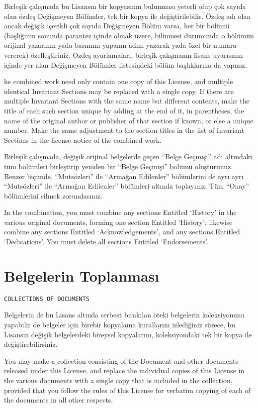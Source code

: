 \begin{multicols}{2}
Birleşik çalışmada bu Lisansın bir kopyasının bulunması yeterli olup çok sayıda olan özdeş Değişmeyen Bölümler, tek bir kopya ile değiştirilebilir. Özdeş adı olan ancak değişik içerikli çok sayıda Değişmeyen Bölüm varsa, her bir bölümü (başlığının sonunda parantez içinde olmak üzere, bilinmesi durumunda o bölümün orijinal yazarının yada basımını yapanın adını yazarak yada özel bir numara vererek) özelleştiriniz. Özdeş ayarlamaları, birleşik çalışmanın lisans uyarısının içinde yer alan Değişmeyen Bölümler listesindeki bölüm başlıklarına da yapınız.
\begin{ingliz}he combined work need only contain one copy of this
License, and multiple identical Invariant Sections may be
replaced with a single copy.  If there are multiple Invariant
Sections with the same name but different contents, make the
title of each such section unique by adding at the end of it,
in parentheses, the name of the original author or publisher
of that section if known, or else a unique number.  Make the
same adjustment to the section titles in the list of Invariant
Sections in the license notice of the combined work.
\end{ingliz}
Birleşik çalışmada, değişik orijinal belgelerde geçen “Belge Geçmişi” adı altındaki tüm bölümleri birleştirip yeniden bir “Belge Geçmişi” bölümü oluşturunuz. Benzer biçimde, ``Mutsözleri'' ile ``Armağan Edilenler'' bölümlerini de ayrı ayrı ``Mutsözleri'' ile ``Armağan Edilenler'' bölümleri altında toplayınız. Tüm “Onay” bölümlerini silmek zorundasınız.
\begin{ingliz}In the combination, you must combine any sections Entitled
`History' in the various original documents,
forming one section Entitled `History'; likewise
combine any sections Entitled `Acknowledgements',
and any sections Entitled `Dedications'.  You
must delete all sections Entitled `Endorsements'.
\end{ingliz}

\section{Belgelerin Toplanması}\hfill\begin{verbatim}COLLECTIONS OF DOCUMENTS\end{verbatim}\label{gfdl-6}
Belgelerin de bu Lisans altında serbest bırakılan öteki belgelerin koleksiyonunu yapabilir de belgeler için birebir kopyalama kurallarını izlediğiniz sürece, bu Lisansın değişik belgelerdeki bireysel kopyalarını, koleksiyondaki tek bir kopya ile değiştirebilirsiniz.
\begin{ingliz}You may make a collection consisting of the Document and
other documents released under this License, and replace the
individual copies of this License in the various documents
with a single copy that is included in the collection,
provided that you follow the rules of this License for
verbatim copying of each of the documents in all other respects.\end{ingliz}


\end{multicols}

